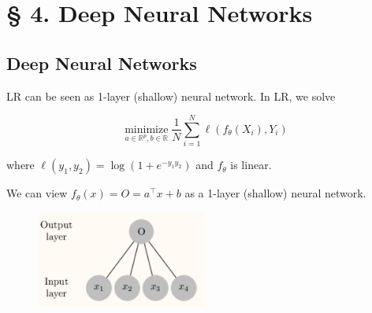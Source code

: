 \section{§ 4. Deep Neural Networks}

\subsection{Deep Neural Networks}

\begin{frame}[allowframebreaks]

\begin{myconceptblock}{4.1}{LR can be seen as 1-layer (shallow) neural network.}
    In LR, we solve

    $$
    \underset{a \in \mathbb{R}^{p}, b \in \mathbb{R}}{\operatorname{minimize}} \frac{1}{N} \sum_{i=1}^{N} \ell\left(f_{\theta}\left(X_{i}\right), Y_{i}\right)
    $$

    where $\ell\left(y_{1}, y_{2}\right)=\log \left(1+e^{-y_{1} y_{2}}\right)$ and $f_{\theta}$ is linear.

    We can view $f_{\theta}(x)=O=a^{\top} x+b$ as a 1-layer (shallow) neural network.

    \begin{figure}[H]
        \centering
        \includegraphics[width=0.5\textwidth]{.././assets/4.1.png}
    \end{figure}
\end{myconceptblock}

\end{frame}

